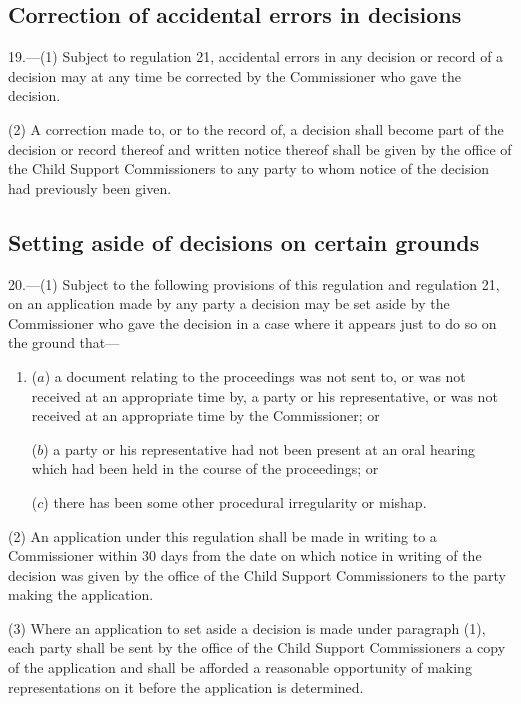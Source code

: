 \documentclass[12pt,a4paper]{article}
\begin{document}
\subsection[19. Correction of accidental errors in decisions]{Correction of accidental errors in decisions}

19.—(1) Subject to regulation 21, accidental errors in any decision or record of a decision may at any time be corrected by the Commissioner who gave the decision.

(2) A correction made to, or to the record of, a decision shall become part of the decision or record thereof and written notice thereof shall be given by the office of the Child Support Commissioners to any party to whom notice of the decision had previously been given.

\subsection[20. Setting aside of decisions on certain grounds]{Setting aside of decisions on certain grounds}

20.—(1) Subject to the following provisions of this regulation and regulation 21, on an application made by any party a decision may be set aside by the Commissioner who gave the decision in a case where it appears just to do so on the ground that—
\begin{enumerate}\item[]
($a$) a document relating to the proceedings was not sent to, or was not received at an appropriate time by, a party or his representative, or was not received at an appropriate time by the Commissioner; or

($b$) a party or his representative had not been present at an oral hearing which had been held in the course of the proceedings; or

($c$) there has been some other procedural irregularity or mishap.
\end{enumerate}

(2) An application under this regulation shall be made in writing to a Commissioner within 30 days from the date on which notice in writing of the decision was given by the office of the Child Support Commissioners to the party making the application.

(3) Where an application to set aside a decision is made under paragraph (1), each party shall be sent by the office of the Child Support Commissioners a copy of the application and shall be afforded a reasonable opportunity of making representations on it before the application is determined.
\end{document}

